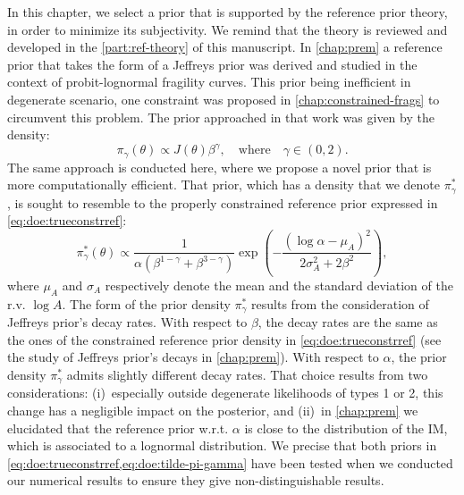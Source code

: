 In this chapter, we select a prior that is supported by the reference prior theory, in order to minimize its subjectivity.
We remind that the theory is reviewed and developed in the \cref{part:ref-theory} of this manuscript. %
In \cref{chap:prem} a reference prior that takes the form of a Jeffreys prior was derived and studied in the context of probit-lognormal fragility curves.
This prior being inefficient in degenerate scenario, one constraint was proposed in \cref{chap:constrained-frags} to circumvent this problem.
The prior approached in that work was given by the density:
    \begin{equation}\label{eq:doe:trueconstrref}
        \pi_\gamma(\theta)\propto J(\theta)\beta^\gamma,\quad\text{where}\quad \gamma\in(0,2).
    \end{equation}
The same approach is conducted here, where we propose a novel prior that is more computationally efficient.
That prior, which has a density that we denote $\pi^\ast_\gamma$, is sought to resemble to the properly constrained reference prior expressed in \cref{eq:doe:trueconstrref}:
    \begin{equation}\label{eq:doe:tilde-pi-gamma}
        \pi^\ast_\gamma(\theta) \propto\frac{1}{\alpha(\beta^{1-\gamma}+\beta^{3-\gamma})}\exp\left(-\frac{(\log\alpha-\mu_A)^2}{2\sigma_A^2+2\beta^2}\right),
    \end{equation}
    where $\mu_A$ and $\sigma_A$ respectively denote the mean and the standard deviation of the r.v. $\log A$.
The form of the prior density $\pi^\ast_\gamma$ results from the consideration of Jeffreys prior's decay rates. With respect to $\beta$, the decay rates are the same as the ones of the constrained reference prior density in \cref{eq:doe:trueconstrref} (see the study of Jeffreys prior's decays in \cref{chap:prem}). With respect to $\alpha$, the prior density $\pi^\ast_\gamma$ admits slightly different decay rates. That choice results from two considerations: (i)~especially outside degenerate likelihoods of types 1 or 2, this change has a negligible impact on the posterior, and (ii)~in \cref{chap:prem} we elucidated that the reference prior w.r.t. $\alpha$ is close to the distribution of the IM, which is associated to a lognormal distribution.
We precise that both priors in \cref{eq:doe:trueconstrref,eq:doe:tilde-pi-gamma} have been tested when we conducted our numerical results to ensure they give non-distinguishable results.

